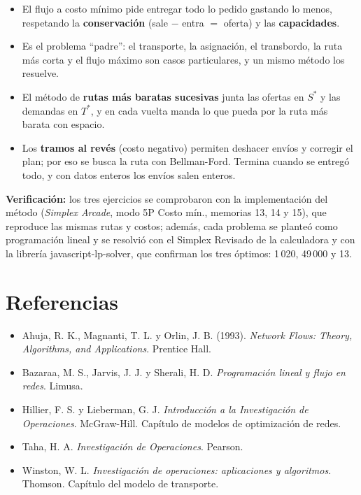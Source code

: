\documentclass[11pt,a4paper]{article}
\newcommand{\Sini}{\ensuremath{S^{*}}}
\newcommand{\Tfin}{\ensuremath{T^{*}}}
\begin{document}
\begin{idea}[Conclusiones]
\begin{itemize}[itemsep=2pt, leftmargin=*]
  \item El flujo a costo mínimo pide entregar todo lo pedido gastando lo menos, respetando la \textbf{conservación}
        (sale $-$ entra $=$ oferta) y las \textbf{capacidades}.
  \item Es el problema ``padre'': el transporte, la asignación, el transbordo, la ruta más corta y el flujo máximo son
        casos particulares, y un mismo método los resuelve.
  \item El método de \textbf{rutas más baratas sucesivas} junta las ofertas en \Sini{} y las demandas en \Tfin, y en cada
        vuelta manda lo que pueda por la ruta más barata con espacio.
  \item Los \textbf{tramos al revés} (costo negativo) permiten deshacer envíos y corregir el plan; por eso se busca la
        ruta con Bellman-Ford. Termina cuando se entregó todo, y con datos enteros los envíos salen enteros.
\end{itemize}
\end{idea}

\textbf{Verificación:} los tres ejercicios se comprobaron con la implementación del método (\emph{Simplex Arcade},
modo 5P Costo mín., memorias 13, 14 y 15), que reproduce las mismas rutas y costos; además, cada problema se planteó como
programación lineal y se resolvió con el Simplex Revisado de la calculadora y con la librería javascript-lp-solver, que
confirman los tres óptimos: 1\,020, 49\,000 y 13.

\section*{Referencias}
\begin{itemize}[leftmargin=*, itemsep=1pt]
  \item Ahuja, R. K., Magnanti, T. L. y Orlin, J. B. (1993). \textit{Network Flows: Theory, Algorithms, and Applications}. Prentice Hall.
  \item Bazaraa, M. S., Jarvis, J. J. y Sherali, H. D. \textit{Programación lineal y flujo en redes}. Limusa.
  \item Hillier, F. S. y Lieberman, G. J. \textit{Introducción a la Investigación de Operaciones}. McGraw-Hill.
        Capítulo de modelos de optimización de redes.
  \item Taha, H. A. \textit{Investigación de Operaciones}. Pearson.
  \item Winston, W. L. \textit{Investigación de operaciones: aplicaciones y algoritmos}. Thomson. Capítulo del modelo de transporte.
\end{itemize}
\end{document}
